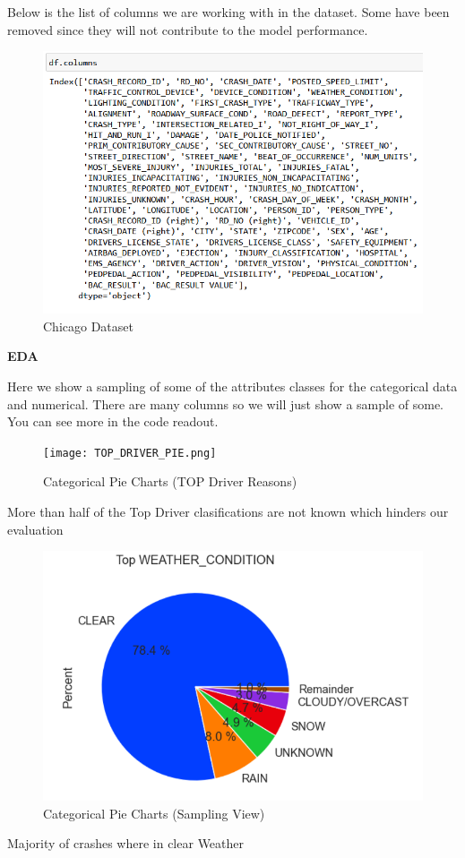 \documentclass[conference]{IEEEtran}
\begin{document}
Below is the list of columns we are working with in the dataset.  Some have been removed since they will not contribute to the model performance.
\begin{figure}[!h]
	\includegraphics[width=\linewidth]{Chicago_Column.png}
	\caption{Chicago Dataset}
	\label{fig: Chicago Dataset for Crashes and People involved}
 \end{figure}
 \begin{center} 
	\textbf{EDA} 
	\end{center}
Here we show a sampling of some of the attributes classes for the categorical data and numerical.  There are many columns so we will just show a sample of some. You can see more in the code readout. 
\begin{figure}[!h]
	\texttt{[image: TOP\_DRIVER\_PIE.png]}
	\caption{Categorical Pie Charts (TOP Driver Reasons)}
	\label{fig: Top Driver Condition Pie chart}
 \end{figure}
More than half of the Top Driver clasifications are not known which hinders our evaluation

\begin{figure}[!h]
	\includegraphics[width=\linewidth]{TOP_WEATHER_CONDITION_PIE.png}
	\caption{Categorical Pie Charts (Sampling View)}
	\label{fig: Top_Weather_Condition Pie chart}
 \end{figure}
Majority of crashes where in clear Weather
 
\end{document}

